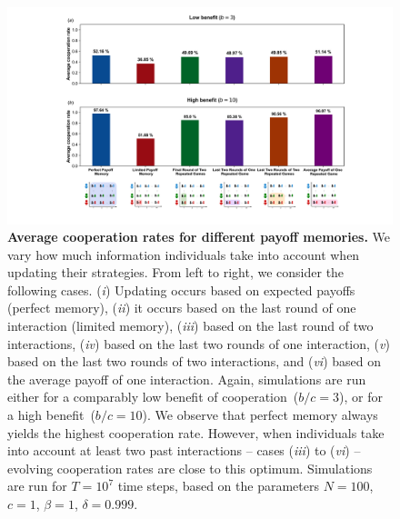 \documentclass[11pt]{article}
\theoremstyle{plainCl1}
\theoremstyle{plainCl2}
\begin{document}
\begin{figure}[t]
  \centering
  \includegraphics[width=\textwidth]{more_memory_summary_results.pdf}
  \caption{{\bf Average cooperation rates for different payoff memories.}
  We vary how much information individuals take into account when updating their strategies. 
  From left to right, we consider the following cases.
  ({\it i}) Updating occurs based on expected payoffs (perfect memory), 
  ({\it ii}) it occurs based on the last round of one interaction (limited memory), 
  ({\it iii}) based on the last round of two interactions,
  ({\it iv}) based on the last two rounds of one interaction,
  ({\it v}) based on the last two rounds of two interactions, and
  ({\it vi}) based on the average payoff of one interaction.
  Again, simulations are run either for a comparably low benefit of cooperation~($b/c\!=\!3$), or for a high benefit~($b/c\!=\!10$). 
  We observe that perfect memory always yields the highest cooperation rate. 
  However, when individuals take into account at least two past interactions -- cases ({\it iii}) to ({\it vi}) -- evolving cooperation rates are close to this optimum. 
  Simulations are run for $T\!=\!10^7$ time steps, based on the parameters $N\!=\!100$, $c\!=\!1$, $\beta\!=\!1$, $\delta\!=\!0.999$.}
\label{fig:cooperation_rate_all_updating_payoffs}
\end{figure}
\end{document}
